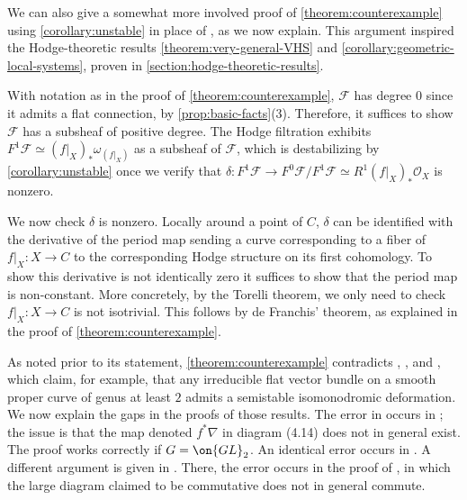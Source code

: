\begin{remark}
\notready
	\label{remark:alternate-hodge-proof}
	We can also give a somewhat more involved proof of
	\autoref{theorem:counterexample} using \autoref{corollary:unstable} in
	place of \cite[Theorem
	4]{cataneseD:answer-to-a-question-by-fujita}, as we now explain. This argument inspired the Hodge-theoretic results \autoref{theorem:very-general-VHS} and \autoref{corollary:geometric-local-systems}, proven in \autoref{section:hodge-theoretic-results}.

	With notation as in the proof of
	\autoref{theorem:counterexample},
	$\mathscr{F}$ has degree $0$ since it admits a flat connection, by
	\autoref{prop:basic-facts}(3).
	Therefore, it suffices to show $\mathscr{F}$ has a subsheaf of positive
degree.
The Hodge filtration exhibits $F^1\mathscr F\simeq (f|_X)_* \omega_{(f|_X)}$ as a subsheaf
of $\mathscr F$,
which is destabilizing by
\autoref{corollary:unstable}
once we verify that
$\delta: F^1\mathscr F \to F^0 \mathscr F/ F^1 \mathscr F \simeq R^1 (f|_X)_* \mathscr{O}_{X}$
is nonzero.

We now check $\delta$ is nonzero.
Locally around a point of $C$, $\delta$
can be identified with the derivative of the period map
\cite[Theorem 5.3.4]{carlsonMP:period-mappings}
sending a curve corresponding to a fiber of
$f|_X : X \to C$
to the corresponding Hodge structure on its first cohomology. To show this derivative is not identically zero it suffices to show that the period map is non-constant.
More concretely, by the Torelli theorem, we only need to check
$f|_X: X \to C$ is not isotrivial.
This follows by de Franchis' theorem, as explained in the proof of
\autoref{theorem:counterexample}.
\end{remark}

\begin{remark}
\notready
	\label{remark:bhh-error}
	As noted prior to its statement,
	\autoref{theorem:counterexample} contradicts
\cite[Theorem 1.3]{BHH:logarithmic},
\cite[Theorem 1.3]{BHH:irregular}, and
\cite[Theorem 1.2]{BHH:parabolic}, which claim, for example, that any irreducible flat vector bundle on a smooth proper  curve of genus at least $2$ admits a semistable isomonodromic deformation. We now explain the gaps in the proofs of
those results. The error in \cite[Theorem 1.3]{BHH:logarithmic} occurs in
\cite[Proposition 4.3]{BHH:logarithmic}; the issue is that the map denoted
$f^*\nabla$ in diagram (4.14) does not in general exist. The proof works
correctly if $G=\on{GL}_2$. An identical error occurs in \cite[Proposition
4.4]{BHH:irregular}. A different argument is given in \cite{BHH:parabolic}.
There, the error occurs in the proof of \cite[Proposition 5.1]{BHH:parabolic},
in which the large diagram claimed to be commutative does not in general commute.
\end{remark}
